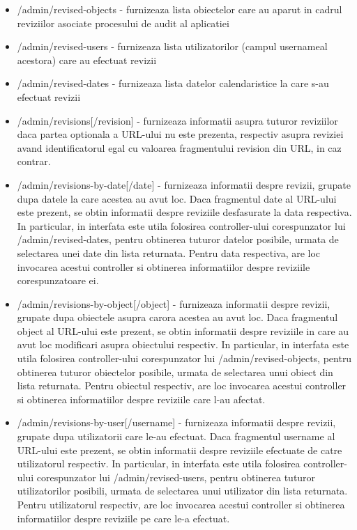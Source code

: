 \begin{itemize}
\item{/admin/revised-objects - furnizeaza lista obiectelor care au aparut in cadrul reviziilor asociate procesului de audit al aplicatiei}
\item{/admin/revised-users - furnizeaza lista utilizatorilor (campul usernameal acestora) care au efectuat revizii}
\item{/admin/revised-dates - furnizeaza lista datelor calendaristice la care s-au efectuat revizii}
\item{/admin/revisions[/{revision}] - furnizeaza informatii asupra tuturor reviziilor daca partea optionala a URL-ului nu este prezenta, respectiv asupra reviziei avand identificatorul egal cu valoarea fragmentului revision din URL, in caz contrar.}
\item{/admin/revisions-by-date[/{date}] - furnizeaza informatii despre revizii, grupate dupa datele la care acestea au avut loc. Daca fragmentul date al URL-ului este prezent, se obtin informatii despre reviziile desfasurate la data respectiva. In particular, in interfata este utila folosirea controller-ului corespunzator lui /admin/revised-dates, pentru obtinerea tuturor datelor posibile, urmata de selectarea unei date din lista returnata. Pentru data respectiva, are loc invocarea acestui controller si obtinerea informatiilor despre reviziile corespunzatoare ei.}
\item{/admin/revisions-by-object[/{object}] - furnizeaza informatii despre revizii, grupate dupa obiectele asupra carora acestea au avut loc. Daca fragmentul object al URL-ului este prezent, se obtin informatii despre reviziile in care au avut loc modificari asupra obiectului respectiv. In particular, in interfata este utila folosirea controller-ului corespunzator lui /admin/revised-objects, pentru obtinerea tuturor obiectelor posibile, urmata de selectarea unui obiect din lista returnata. Pentru obiectul respectiv, are loc invocarea acestui controller si obtinerea informatiilor despre reviziile care l-au afectat.}
\item{/admin/revisions-by-user[/{username}] - furnizeaza informatii despre revizii, grupate dupa utilizatorii care le-au efectuat. Daca fragmentul username al URL-ului este prezent, se obtin informatii despre reviziile efectuate de catre utilizatorul respectiv. In particular, in interfata este utila folosirea controller-ului corespunzator lui /admin/revised-users, pentru obtinerea tuturor utilizatorilor posibili, urmata de selectarea unui utilizator din lista returnata. Pentru utilizatorul respectiv, are loc invocarea acestui controller si obtinerea informatiilor despre reviziile pe care le-a efectuat.}

\end{itemize}
